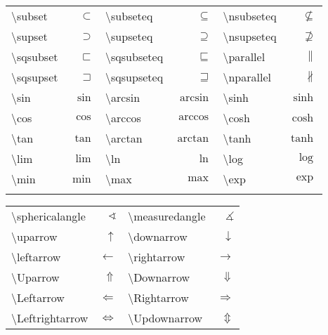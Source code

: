\begin{center}
            \begin{tabular}{ l r | l r | l r }
                \textbackslash subset & $\subset$ & \textbackslash subseteq  & $\subseteq$ & \textbackslash nsubseteq & $\nsubseteq$ \\
                \textbackslash supset & $\supset$ & \textbackslash supseteq  & $\supseteq$ & \textbackslash nsupseteq & $\nsupseteq$ \\
                \textbackslash sqsubset & $\sqsubset$ & \textbackslash sqsubseteq  & $\sqsubseteq$ & \textbackslash parallel & $\parallel$ \\
                \textbackslash sqsupset & $\sqsupset$ & \textbackslash sqsupseteq  & $\sqsupseteq$ & \textbackslash nparallel & $\nparallel$ \\
                \textbackslash sin & $\sin$ & \textbackslash arcsin & $\arcsin$ & \textbackslash sinh & $\sinh$ \\
                \textbackslash cos & $\cos$ & \textbackslash arccos & $\arccos$ & \textbackslash cosh & $\cosh$ \\
                \textbackslash tan & $\tan$ & \textbackslash arctan & $\arctan$ & \textbackslash tanh & $\tanh$ \\
                \textbackslash lim & $\lim$ & \textbackslash ln & $\ln$ & \textbackslash log & $\log$ \\
                \textbackslash min & $\min$ & \textbackslash max & $\max$ & \textbackslash exp & $\exp$ \\
                \\
            \end{tabular}

            \begin{tabular}{ l r | l r }
                \textbackslash sphericalangle & $\sphericalangle$ & \textbackslash measuredangle & $\measuredangle$ \\
                \textbackslash uparrow & $\uparrow$ & \textbackslash downarrow & $\downarrow$ \\
                \textbackslash leftarrow & $\leftarrow$ & \textbackslash rightarrow & $\rightarrow$ \\
                \textbackslash Uparrow & $\Uparrow$ & \textbackslash Downarrow & $\Downarrow$ \\
                \textbackslash Leftarrow & $\Leftarrow$ & \textbackslash Rightarrow & $\Rightarrow$ \\
                \textbackslash Leftrightarrow & $\Leftrightarrow$ & \textbackslash Updownarrow & $\Updownarrow$ \\
            \end{tabular}
        \end{center}
